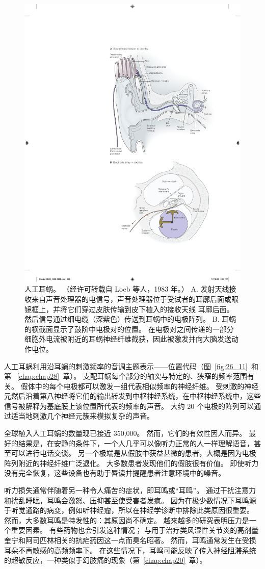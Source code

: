 \begin{figure}[htbp]
	\centering
	\includegraphics[width=0.7\linewidth]{chap26/fig_26_19}
	\caption{人工耳蜗。 （经许可转载自 Loeb 等人，1983 年。） A. 发射天线接收来自声音处理器的电信号，声音处理器位于受试者的耳廓后面或眼镜框上，并将它们穿过皮肤传输到皮下植入的接收天线 耳廓后面。 然后信号通过细电缆（深紫色）传送到耳蜗中的电极阵列。 B. 耳蜗的横截面显示了鼓阶中电极对的位置。 在电极对之间传递的一部分细胞外电流被附近的耳蜗神经纤维截获，因此被激发并向大脑发送动作电位。}
	\label{fig:26_19}
\end{figure}


人工耳蜗利用沿耳蜗的刺激频率的音调主题表示——位置代码（图~\ref{fig:26_11}~和第~ \ref{chap:chap28}~章）。
支配耳蜗每个部分的轴突与特定的、狭窄的频率范围有关。
假体中的每个电极都可以激发一组代表相似频率的神经纤维。
受刺激的神经元然后沿着第八神经将它们的输出转发到中枢神经系统，在中枢神经系统中，这些信号被解释为基底膜上该位置所代表的频率的声音。
大约 20 个电极的阵列可以通过适当地刺激几个神经元簇来模拟复杂的声音。


全球植入人工耳蜗的数量现已接近 350,000。
然而，它们的有效性因人而异。
最好的结果是，在安静的条件下，一个人几乎可以像听力正常的人一样理解语音，甚至可以进行电话交谈。
另一个极端是从假肢中获益甚微的患者，大概是因为电极阵列附近的神经纤维广泛退化。
大多数患者发现他们的假肢很有价值。
即使听力没有完全恢复，这些设备也有助于唇读并提醒患者注意环境中的噪音。


听力损失通常伴随着另一种令人痛苦的症状，即耳鸣或“耳鸣”。
通过干扰注意力和扰乱睡眠，耳鸣会激怒、压抑甚至使受害者发疯。
因为在极少数情况下耳鸣源于听觉通路的病变，例如听神经瘤，所以在神经学诊断中排除此类原因很重要。
然而，大多数耳鸣是特发性的：其原因尚不确定。
越来越多的研究表明压力是一个重要因素。
有些药物也会引发这种情况；
与用于治疗类风湿性关节炎的高剂量奎宁和阿司匹林相关的抗疟药因这一点而臭名昭著。
然而，耳鸣通常发生在受损耳朵不再敏感的高频频率下。
在这些情况下，耳鸣可能反映了传入神经阻滞系统的超敏反应，一种类似于幻肢痛的现象（第~\ref{chap:chap20}~章）。



